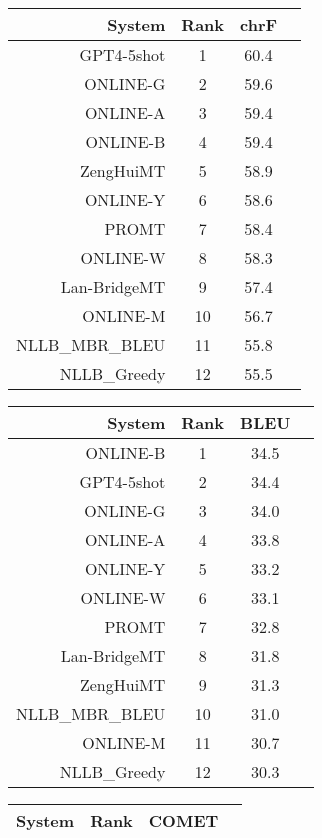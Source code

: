 \documentclass[11pt]{article}
\begin{document}
\begin{table}  
\scriptsize\begin{subtable}[t]{0.33\textwidth}
\begin{tabular}{rccc}
\toprule 
System & Rank & chrF \\ 
\midrule 
GPT4-5shot & 1 & 60.4 \\ 
ONLINE-G & 2 & 59.6 \\ 
ONLINE-A & 3 & 59.4 \\ 
ONLINE-B & 4 & 59.4 \\ 
ZengHuiMT & 5 & 58.9 \\ 
ONLINE-Y & 6 & 58.6 \\ 
PROMT & 7 & 58.4 \\ 
ONLINE-W & 8 & 58.3 \\ 
Lan-BridgeMT & 9 & 57.4 \\ 
ONLINE-M & 10 & 56.7 \\ 
NLLB\_MBR\_BLEU & 11 & 55.8 \\ 
NLLB\_Greedy & 12 & 55.5 \\ 
\bottomrule 
\end{tabular} 
\end{subtable} 
\begin{subtable}[t]{0.33\textwidth}
\begin{tabular}{rccc}
\toprule 
System & Rank & BLEU \\ 
\midrule 
ONLINE-B & 1 & 34.5 \\ 
GPT4-5shot & 2 & 34.4 \\ 
ONLINE-G & 3 & 34.0 \\ 
ONLINE-A & 4 & 33.8 \\ 
ONLINE-Y & 5 & 33.2 \\ 
ONLINE-W & 6 & 33.1 \\ 
PROMT & 7 & 32.8 \\ 
Lan-BridgeMT & 8 & 31.8 \\ 
ZengHuiMT & 9 & 31.3 \\ 
NLLB\_MBR\_BLEU & 10 & 31.0 \\ 
ONLINE-M & 11 & 30.7 \\ 
NLLB\_Greedy & 12 & 30.3 \\ 
\bottomrule 
\end{tabular} 
\end{subtable} 
\begin{subtable}[t]{0.33\textwidth}
\begin{tabular}{rccc}
\toprule 
System & Rank & COMET \\ 
\midrule 

\end{tabular}
\end{subtable}
\end{table}
\end{document}

